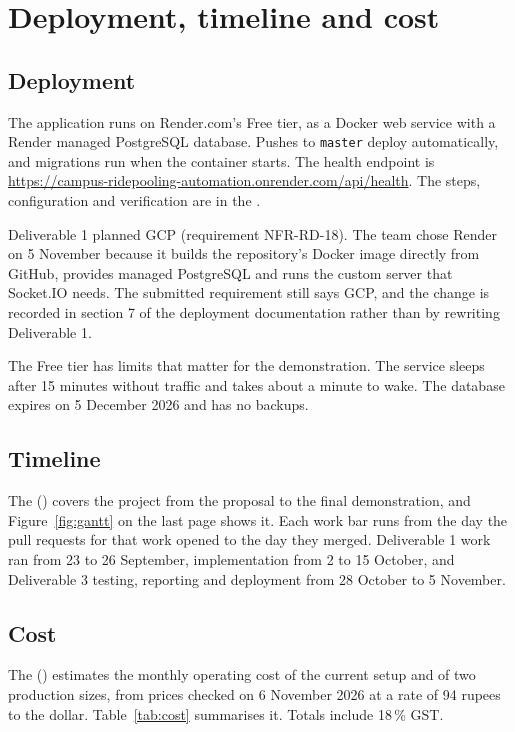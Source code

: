 \section{Deployment, timeline and cost}\label{sec:deployment}

\subsection{Deployment}
The application runs on Render.com's Free tier, as a Docker web service with a Render managed PostgreSQL
database. Pushes to \texttt{master} deploy automatically, and migrations run when the container starts.
The health endpoint is \url{https://campus-ridepooling-automation.onrender.com/api/health}. The steps,
configuration and verification are in the
.

Deliverable 1 planned GCP (requirement NFR-RD-18). The team chose Render on 5 November because it builds
the repository's Docker image directly from GitHub, provides managed PostgreSQL and runs the custom server
that Socket.IO needs. The submitted requirement still says GCP, and the change is recorded in section 7 of
the deployment documentation rather than by rewriting Deliverable 1.

The Free tier has limits that matter for the demonstration. The service sleeps after 15 minutes without
traffic and takes about a minute to wake. The database expires on 5 December 2026 and has no backups.

\subsection{Timeline}
The  () covers
the project from the proposal to the final demonstration, and Figure~\ref{fig:gantt} on the last page shows it. Each work bar
runs from the day the pull requests for that work opened to the day they merged. Deliverable 1 work ran from
23 to 26 September, implementation from 2 to 15 October, and Deliverable 3 testing, reporting and deployment
from 28 October to 5 November.

\subsection{Cost}
The 
() estimates the monthly operating cost of the current setup and of two production sizes,
from prices checked on 6 November 2026 at a rate of 94 rupees to the dollar.
Table~\ref{tab:cost} summarises it. Totals include 18\,\% GST.


